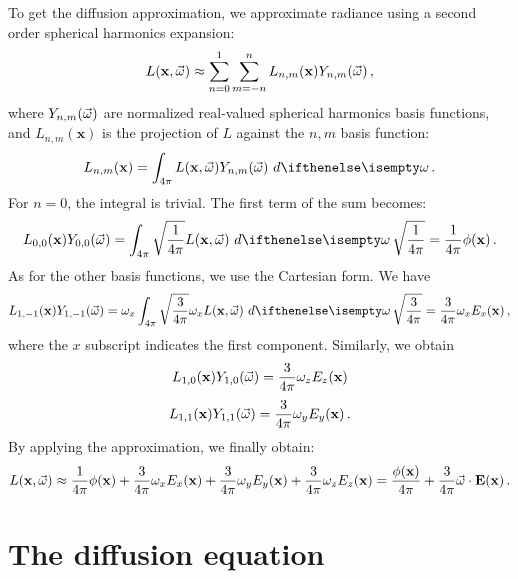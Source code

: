 \documentclass[10pt,a4paper]{article}
\begin{document}
To get the diffusion approximation, we approximate radiance using a second order spherical harmonics expansion:
$$
{L}(\mathbf{x}, \vec{\omega}) \approx \sum_{n = 0}^{1} \sum_{m = -n}^{n} L_{n,m}(\mathbf{x}) Y_{n,m}(\vec{\omega}) \, ,
$$
where $Y_{n,m}(\vec{\omega})$ are normalized real-valued spherical harmonics basis functions,
and $L_{n,m}(\mathbf{x})$ is the projection of $L$ against the $n,m$ basis function:
$$
L_{n,m}(\mathbf{x}) = \sphere{\xomegafunc{L} Y_{n,m}(\omegavec)}{} \, .
$$
For $n = 0$, the integral is trivial.  The first term of the sum becomes:
$$
L_{0,0}(\mathbf{x}) Y_{0,0}(\omegavec) = \sphere{\sqrt{\frac{1}{4\pi}} \xomegafunc{L}}{} \, \sqrt{\frac{1}{4\pi}} = \frac{1}{4\pi} \xfunc{\phi} \, .
$$
As for the other basis functions, we use the Cartesian form. We have
$$
L_{1,-1}(\mathbf{x}) Y_{1,-1}(\omegavec) = \omega_x \sphere{\sqrt{\frac{3}{4\pi}} \omega_x \xomegafunc{L}}{} \, \sqrt{\frac{3}{4\pi}} = \frac{3}{4\pi} \omega_x {E}_x(\mathbf{x}) \, ,
$$
where the $x$ subscript indicates the first component. Similarly, we obtain
$$
L_{1,0}(\mathbf{x}) Y_{1,0}(\vec{\omega}) = \frac{3}{4\pi} \omega_z {E}_z(\mathbf{x})
$$
$$
L_{1,1}(\mathbf{x}) Y_{1,1}(\vec{\omega}) = \frac{3}{4\pi} \omega_y {E}_y(\mathbf{x}) \, .
$$
By applying the approximation, we finally obtain:
$$
{L}(\mathbf{x}, \vec{\omega}) \approx \frac{1}{4\pi} {\phi}(\mathbf{x}) + \frac{3}{4\pi} \omega_x {E}_x(\mathbf{x}) + \frac{3}{4\pi} \omega_y {E}_y(\mathbf{x})+ \frac{3}{4\pi} \omega_z {E}_z(\mathbf{x}) = \frac{{\phi}(\mathbf{x})}{4\pi} + \frac{3}{4\pi} \vec{\omega} \cdot \mathbf{E}(\mathbf{x}) \, .
$$

\section{The diffusion equation}
\end{document}
